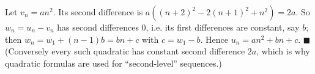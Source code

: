 Let $v_n=an^2$. Its second difference is $a\left((n+2)^2-2(n+1)^2+n^2\right)=2a$. So $w_n=u_n-v_n$ has second differences $0$, i.e. its first differences are constant, say $b$; then $w_n=w_1+(n-1)b=bn+c$ with $c=w_1-b$. Hence $u_n=an^2+bn+c$. $\blacksquare$ (Conversely every such quadratic has constant second difference $2a$, which is why quadratic formulas are used for ``second-level'' sequences.)
